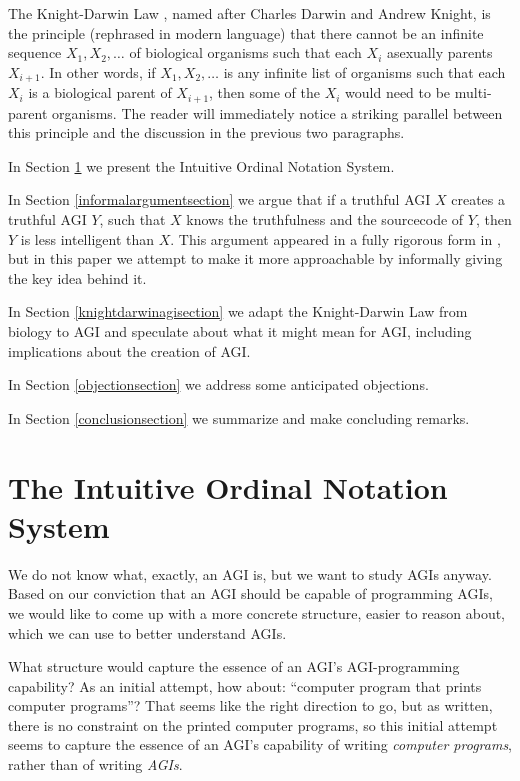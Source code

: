 \documentclass[runningheads]{llncs}
\begin{document}
The Knight-Darwin Law \cite{darwin1898knight}, named after Charles Darwin
and Andrew Knight, is the
principle (rephrased in modern language) that there cannot be an infinite
sequence $X_1,X_2,\ldots$ of biological organisms such that each $X_i$ asexually
parents $X_{i+1}$. In other words, if $X_1,X_2,\ldots$ is any infinite list of
organisms such that each $X_i$ is a biological parent of $X_{i+1}$, then some of the
$X_i$ would need to be multi-parent organisms.
The reader will immediately notice a striking parallel between
this principle and the discussion in the previous two paragraphs.

In Section \ref{notationsystemsection} we present the Intuitive Ordinal Notation
System.

In Section \ref{informalargumentsection} we argue that if a truthful AGI $X$ creates
a truthful AGI $Y$, such that $X$
knows the truthfulness and the sourcecode of $Y$, then $Y$ is less intelligent
than $X$. This argument appeared in a fully rigorous form in \cite{alexander2019measuring},
but in this paper we attempt to make it more approachable by informally giving
the key idea behind it.

In Section \ref{knightdarwinagisection} we adapt the Knight-Darwin Law from biology to AGI
and speculate about what it might mean for AGI, including implications about
the creation of AGI.

In Section \ref{objectionsection} we address some anticipated objections.

In Section \ref{conclusionsection} we summarize and make concluding remarks.


\section{The Intuitive Ordinal Notation System}
\label{notationsystemsection}

We do not know what, exactly, an AGI is, but we want to study AGIs anyway.
Based on our conviction that an AGI should be capable of programming AGIs,
we would like to come up with a more concrete structure, easier to reason
about, which we can use to better understand AGIs.

What structure would capture the essence of an AGI's AGI-programming
capability? As an initial attempt, how about: ``computer
program that prints computer programs''? That seems like the right direction
to go, but as written, there is no constraint on the printed computer programs, so
this initial attempt seems to capture the essence of an
AGI's capability of writing \emph{computer programs}, rather than of writing \emph{AGIs}.
\end{document}

